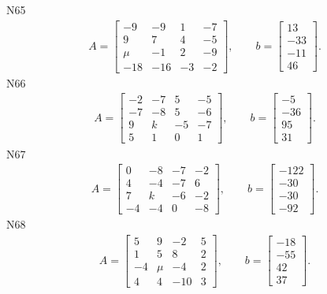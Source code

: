 \documentclass[11pt]{report}
\begin{document}
N65
\begin{align*}
 A = \left[\begin{matrix}-9 & -9 & 1 & -7\\9 & 7 & 4 & -5\\\mu & -1 & 2 & -9\\-18 & -16 & -3 & -2\end{matrix}\right],
\qquad b = \left[\begin{matrix}13\\-33\\-11\\46\end{matrix}\right]. 
 \end{align*}
N66
\begin{align*}
 A = \left[\begin{matrix}-2 & -7 & 5 & -5\\-7 & -8 & 5 & -6\\9 & k & -5 & -7\\5 & 1 & 0 & 1\end{matrix}\right],
\qquad b = \left[\begin{matrix}-5\\-36\\95\\31\end{matrix}\right]. 
 \end{align*}
N67
\begin{align*}
 A = \left[\begin{matrix}0 & -8 & -7 & -2\\4 & -4 & -7 & 6\\7 & k & -6 & -2\\-4 & -4 & 0 & -8\end{matrix}\right],
\qquad b = \left[\begin{matrix}-122\\-30\\-30\\-92\end{matrix}\right]. 
 \end{align*}
N68
\begin{align*}
 A = \left[\begin{matrix}5 & 9 & -2 & 5\\1 & 5 & 8 & 2\\-4 & \mu & -4 & 2\\4 & 4 & -10 & 3\end{matrix}\right],
\qquad b = \left[\begin{matrix}-18\\-55\\42\\37\end{matrix}\right]. 
 \end{align*}
\end{document}
